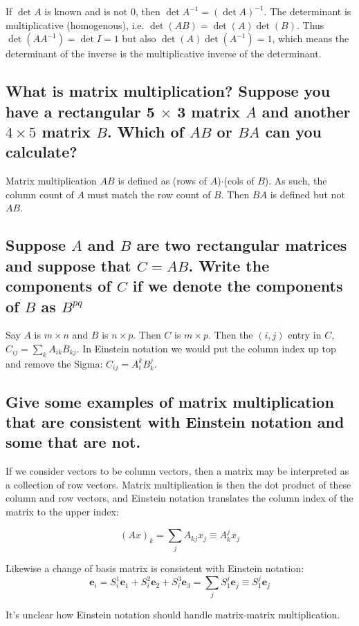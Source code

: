 \documentclass{article}
\newcommand{\basis}{\mathbf{e}_1}
\newcommand{\basiss}{\mathbf{e}_2}
\newcommand{\basisss}{\mathbf{e}_3}
\begin{document}
If $\det A$ is known and is not 0, then $\det A^{-1} = (\det A)^{-1}$. The determinant is multiplicative (homogenous), i.e. $\det(AB) = \det(A)\det(B)$. Thus $\det (AA^{-1}) = \det I = 1$ but also $\det(A)\det(A^{-1}) = 1$, which means the determinant of the inverse is the multiplicative inverse of the determinant.

\subsection{What is matrix multiplication? Suppose you have a rectangular 5 $\times$ 3 matrix $A$ and another $4 \times 5$ matrix $B$. Which of $AB$ or $BA$ can you calculate?}

Matrix multiplication $AB$ is defined as (rows of $A$)$\cdot$(cols of $B$). As such, the column count of $A$ must match the row count of $B$. Then $BA$ is defined but not $AB$.

\subsection{Suppose $A$ and $B$ are two rectangular matrices and suppose that $C=AB$. Write the components of $C$ if we denote the components of $B$ as $B^{pq}$}

Say $A$ is $m \times n$ and $B$ is $n \times p$. Then $C$ is $m \times p$. Then the $(i,j)$ entry in $C$, $C_{ij} = \sum_k A_{ik} B_{kj}$. In Einstein notation we would put the column index up top and remove the Sigma: $C_{ij} = A^k_i B^j_k$.

\subsection{Give some examples of matrix multiplication that are consistent with Einstein notation and some that are not.}

If we consider vectors to be column vectors, then a matrix may be interpreted as a collection of row vectors. Matrix multiplication is then the dot product of these column and row vectors, and Einstein notation translates the column index of the matrix to the upper index:

$$(Ax)_k = \sum_{j}A_{kj}x_j \equiv A^j_k x_j$$

Likewise a change of basis matrix is consistent with Einstein notation: 
$$\mathbf{e}_i = S_i^1 \basis + S_i^2 \basiss + S_i^3 \basisss = \sum_j S_1^j \mathbf{e}_j \equiv S_1^j \mathbf{e}_j$$

It's unclear how Einstein notation should handle matrix-matrix multiplication.
\end{document}
